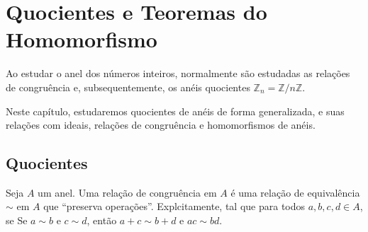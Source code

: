 \chapter{Quocientes e Teoremas do Homomorfismo}

Ao estudar o anel dos números inteiros, normalmente são estudadas as relações de congruência e, subsequentemente, os anéis quocientes $\mathbb Z_n=\mathbb Z/n\mathbb Z$.

Neste capítulo, estudaremos quocientes de anéis de forma generalizada, e suas relações com ideais, relações de congruência e homomorfismos de anéis.

\section{Quocientes}
\begin{definition}
    Seja $A$ um anel. Uma relação de congruência em $A$ é uma relação de equivalência $\sim$ em $A$ que ``preserva operações''. Explcitamente, tal que para todos $a, b, c, d \in A$, se Se $a\sim b$ e $c\sim d$, então $a+c\sim b+d$ e $ac\sim bd$.
\end{definition}


